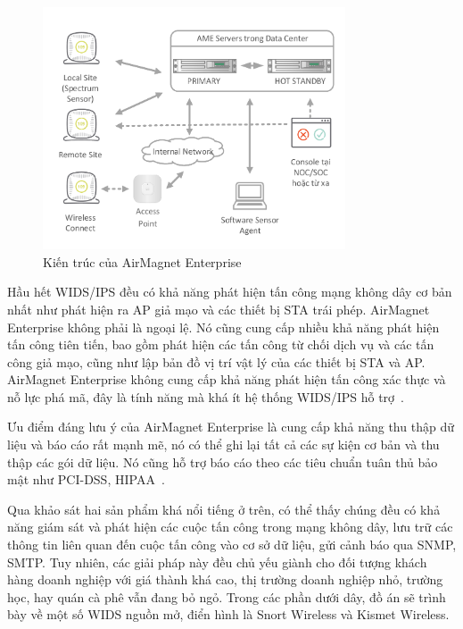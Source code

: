 \begin{figure}[H]
    \centering
    \includegraphics[width=0.8\textwidth]{ame-architect}
    \caption{
        \label{fig:ame-architect}
        Kiến trúc của AirMagnet Enterprise}
\end{figure}

Hầu hết WIDS/IPS đều có khả năng phát hiện tấn công mạng không dây cơ bản nhất như phát hiện ra AP giả mạo và các thiết bị STA trái phép. AirMagnet Enterprise không phải là ngoại lệ. Nó cũng cung cấp nhiều khả năng phát hiện tấn công tiên tiến, bao gồm phát hiện các tấn công từ chối dịch vụ và các tấn công giả mạo, cũng như lập bản đồ vị trí vật lý của các thiết bị STA và AP. AirMagnet Enterprise không cung cấp khả năng phát hiện tấn công xác thực và nỗ lực phá mã, đây là tính năng mà khá ít hệ thống WIDS/IPS hỗ trợ~\cite{karen2016fluke}.

Ưu điểm đáng lưu ý của AirMagnet Enterprise là cung cấp khả năng thu thập dữ liệu và báo cáo rất mạnh mẽ, nó có thể ghi lại tất cả các sự kiện cơ bản và thu thập các gói dữ liệu. Nó cũng hỗ trợ báo cáo theo các tiêu chuẩn tuân thủ bảo mật như PCI-DSS, HIPAA~\cite{karen2016fluke}.

\begin{leftbar}
\noindent Qua khảo sát hai sản phẩm khá nổi tiếng ở trên, có thể thấy chúng đều có khả năng giám sát và phát hiện các cuộc tấn công trong mạng không dây, lưu trữ các thông tin liên quan đến cuộc tấn công vào cơ sở dữ liệu, gửi cảnh báo qua SNMP, SMTP. Tuy nhiên, các giải pháp này đều chủ yếu giành cho đối tượng khách hàng doanh nghiệp với giá thành khá cao, thị trường doanh nghiệp nhỏ, trường học, hay quán cà phê vẫn đang bỏ ngỏ. Trong các phần dưới dây, đồ án sẽ trình bày về một số WIDS nguồn mở, điển hình là Snort Wireless và Kismet Wireless.
\end{leftbar}

